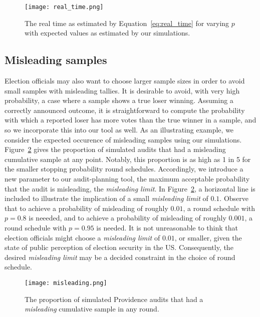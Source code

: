 \begin{figure}
\texttt{[image: real\_time.png]}
\caption{The real time as estimated by Equation~\ref{eq:real_time} for varying $p$ with expected values as estimated by our simulations.}
\label{fig:real_time}
\end{figure}


\subsection{Misleading samples}

Election officials may also want to choose larger sample sizes in order to avoid small samples with misleading tallies. It is desirable to avoid, with very high probability, a case where a sample shows a true loser winning. Assuming a correctly announced outcome, it is straightforward to compute the probability with which a reported loser has more votes than the true winner in a sample, and so we incorporate this into our tool as well. 
As an illustrating example, we consider the expected occurence of misleading samples using our simulations. Figure~\ref{fig:misleading} gives the proportion of simulated audits that had a misleading cumulative sample at any point. Notably, this proportion is as high as 1 in 5 for the smaller stopping probability round schedules. Accordingly, we introduce a new parameter to our audit-planning tool, the maximum acceptable probability that the audit is misleading, the \emph{misleading limit}.
In Figure~\ref{fig:misleading}, a horizontal line is included to illustrate the implication of a small \emph{misleading limit} of $0.1$.
Observe that to achieve a probability of misleading of roughly $0.01$, a round schedule with $p=0.8$ is neeeded, and to achieve a probability of misleading of roughly $0.001$, a round schedule with $p=0.95$ is needed.
It is not unreasonable to think that election officials might choose a \emph{misleading limit} of $0.01$, or smaller, given the state of public perception of election security in the US.
Consequently, the desired \emph{misleading limit} may be a decided constraint in the choice of round schedule.

\begin{figure}
\texttt{[image: misleading.png]}
\caption{The proportion of simulated Providence audits that had a \emph{misleading} cumulative sample in any round.}
\label{fig:misleading}
\end{figure}






